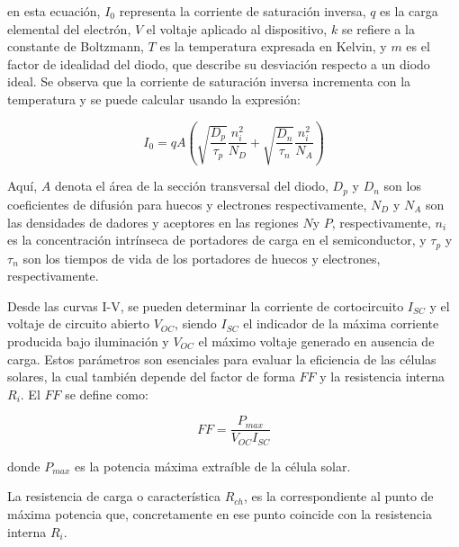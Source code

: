 en esta ecuación, $I_0$ representa la corriente de saturación inversa, $q$ es la carga elemental del electrón, $V$ el voltaje aplicado al dispositivo, $k$ se refiere a la constante de Boltzmann, $T$ es la temperatura expresada en Kelvin, y $m$ es el factor de idealidad del diodo, que describe su desviación respecto a un diodo ideal. Se observa que la corriente de saturación inversa incrementa con la temperatura y se puede calcular usando la expresión:
				
\begin{equation}
	I_0 = q A \left( \sqrt{\frac{D_p}{\tau_p}} \frac{n_i^2}{N_D} + \sqrt{\frac{D_n}{\tau_n}} \frac{n_i^2}{N_A} \right)
\end{equation}

\vspace{\baselineskip}
				
Aquí, $A$ denota el área de la sección transversal del diodo, $D_{p}$ y $D_{n}$ son los coeficientes de difusión para huecos y electrones respectivamente, $N_{D}$ y $N_{A}$ son las densidades de dadores y aceptores en las regiones $N$y $P$, respectivamente, $n_{i}$ es la concentración intrínseca de portadores de carga en el semiconductor, y $\tau_{p}$ y $\tau_{n}$ son los tiempos de vida de los portadores de huecos y electrones, respectivamente.



\vspace{\baselineskip}

Desde las curvas I-V, se pueden determinar la corriente de cortocircuito $I_{SC}$ y el voltaje de circuito abierto $V_{OC}$, siendo $I_{SC}$ el indicador de la máxima corriente producida bajo iluminación y $V_{OC}$ el máximo voltaje generado en ausencia de carga. Estos parámetros son esenciales para evaluar la eficiencia de las células solares, la cual también depende del factor de forma $FF$ y la resistencia interna $R_i$. El $FF$ se define como:

\begin{equation}\label{eq:factorforma}
FF = \frac{P_{max}}{V_{OC} I_{SC}}
\end{equation}

\vspace{\baselineskip}

donde $P_{max}$ es la potencia máxima extraíble de la célula solar. 

\vspace{\baselineskip}

La resistencia de carga o característica  $R_{ch}$, es la correspondiente al punto de máxima potencia que, concretamente en ese punto coincide con la resistencia interna $R_i$.


